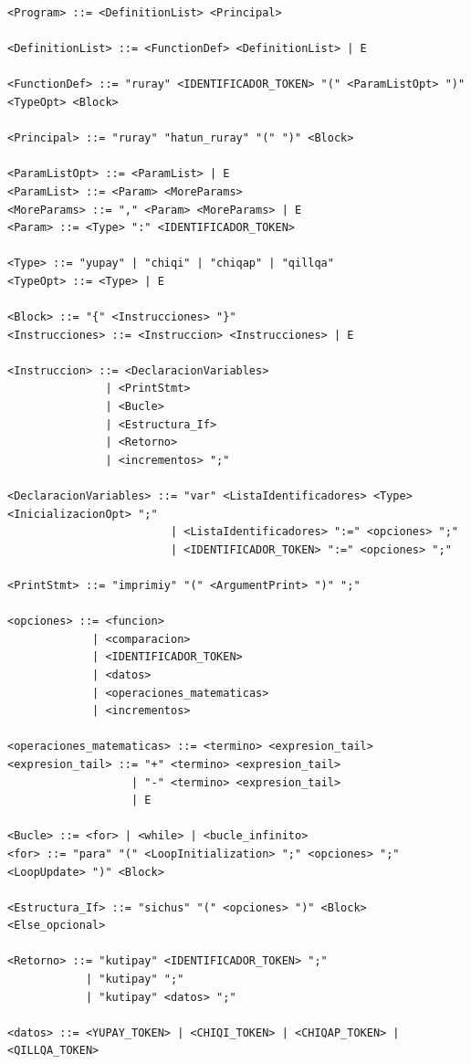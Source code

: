 \documentclass[conference]{IEEEtran}
\begin{document}
\begin{lstlisting}[language=BNF, style=mystyle, caption={Gramática BNF de WayraSimi}]
<Program> ::= <DefinitionList> <Principal>

<DefinitionList> ::= <FunctionDef> <DefinitionList> | E

<FunctionDef> ::= "ruray" <IDENTIFICADOR_TOKEN> "(" <ParamListOpt> ")" <TypeOpt> <Block>

<Principal> ::= "ruray" "hatun_ruray" "(" ")" <Block>

<ParamListOpt> ::= <ParamList> | E
<ParamList> ::= <Param> <MoreParams>
<MoreParams> ::= "," <Param> <MoreParams> | E
<Param> ::= <Type> ":" <IDENTIFICADOR_TOKEN>

<Type> ::= "yupay" | "chiqi" | "chiqap" | "qillqa"
<TypeOpt> ::= <Type> | E

<Block> ::= "{" <Instrucciones> "}"
<Instrucciones> ::= <Instruccion> <Instrucciones> | E

<Instruccion> ::= <DeclaracionVariables>
               | <PrintStmt>
               | <Bucle>
               | <Estructura_If>
               | <Retorno>
               | <incrementos> ";"

<DeclaracionVariables> ::= "var" <ListaIdentificadores> <Type> <InicializacionOpt> ";"
                         | <ListaIdentificadores> ":=" <opciones> ";"
                         | <IDENTIFICADOR_TOKEN> ":=" <opciones> ";"

<PrintStmt> ::= "imprimiy" "(" <ArgumentPrint> ")" ";"

<opciones> ::= <funcion> 
             | <comparacion> 
             | <IDENTIFICADOR_TOKEN> 
             | <datos> 
             | <operaciones_matematicas>
             | <incrementos>

<operaciones_matematicas> ::= <termino> <expresion_tail>
<expresion_tail> ::= "+" <termino> <expresion_tail>
                   | "-" <termino> <expresion_tail>
                   | E

<Bucle> ::= <for> | <while> | <bucle_infinito>
<for> ::= "para" "(" <LoopInitialization> ";" <opciones> ";" <LoopUpdate> ")" <Block>

<Estructura_If> ::= "sichus" "(" <opciones> ")" <Block> <Else_opcional>

<Retorno> ::= "kutipay" <IDENTIFICADOR_TOKEN> ";"
            | "kutipay" ";"
            | "kutipay" <datos> ";"

<datos> ::= <YUPAY_TOKEN> | <CHIQI_TOKEN> | <CHIQAP_TOKEN> | <QILLQA_TOKEN>
\end{lstlisting}
\end{document}
